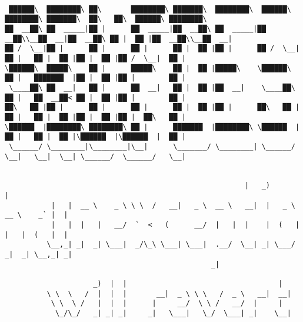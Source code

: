 \documentclass[varwidth=\maxdimen,margin=0.5cm,multi={verbatim}]{standalone}
\begin{document}
\begin{verbatim}

 ██████\  ████████\ ██\       ████████\ ███████\  ████████\  ██████\ ████████\ ███████\  ██\   ██\  ██████\ ████████\
██  __██\ ██  _____|██ |      ██  _____|██  __██\ ██  _____|██  __██\\__██  __|██  __██\ ██ |  ██ |██  __██\\__██  __|
██ /  \__|██ |      ██ |      ██ |      ██ |  ██ |██ |      ██ /  \__|  ██ |   ██ |  ██ |██ |  ██ |██ /  \__|  ██ |
\██████\  █████\    ██ |      █████\    ██ |  ██ |█████\    \██████\    ██ |   ███████  |██ |  ██ |██ |        ██ |
 \____██\ ██  __|   ██ |      ██  __|   ██ |  ██ |██  __|    \____██\   ██ |   ██  __██< ██ |  ██ |██ |        ██ |
██\   ██ |██ |      ██ |      ██ |      ██ |  ██ |██ |      ██\   ██ |  ██ |   ██ |  ██ |██ |  ██ |██ |  ██\   ██ |
\██████  |████████\ ████████\ ██ |      ███████  |████████\ \██████  |  ██ |   ██ |  ██ |\██████  |\██████  |  ██ |
 \______/ \________|\________|\__|      \_______/ \________| \______/   \__|   \__|  \__| \______/  \______/   \__|


                                                         |   _)                       |
           |   |  __ \    _ \ \ \  /   __|   _ \  __ \   __|  |   _ \   __ \    _` |  |
           |   |  |   |   __/  `  <   (      __/  |   |  |    |  (   |  |   |  (   |  |
          \__,_| _|  _| \___|  _/\_\ \___| \___|  .__/  \__| _| \___/  _|  _| \__,_| _|
                                                 _|

                     _)  |  |                                    |
          \ \  \   /  |  |  |       __|  _ \ \ \   /  _ \   __|  __|
           \ \  \ /   |  |  |      |     __/  \ \ /   __/  |     |
            \_/\_/   _| _| _|     _|   \___|   \_/  \___| _|    \__|



\end{verbatim}
\end{document}
